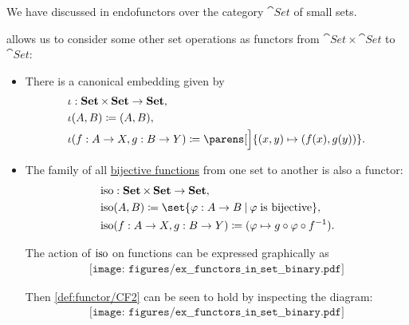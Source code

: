 \begin{example}\label{ex:functors_in_set/binary}
  We have discussed in  endofunctors over the category \( \cat{Set} \) of small sets.

   allows us to consider some other set operations as functors from \( \cat{Set} \times \cat{Set} \) to \( \cat{Set} \):
  \begin{itemize}
    \item There is a canonical embedding given by
    \begin{equation*}
      \begin{aligned}
        &\iota: \cat{Set} \times \cat{Set} \to \cat{Set}, \\
        &\iota(A, B) \coloneqq (A, B), \\
        &\iota(f: A \to X, g: B \to Y) \coloneqq \parens[\Big]{ (x, y) \mapsto (f(x), g(y)) }.
      \end{aligned}
    \end{equation*}

    \item The family of all \hyperref[def:function_invertibility/bijective]{bijective functions} from one set to another is also a functor:
    \begin{equation*}
      \begin{aligned}
        &\op{iso}: \cat{Set} \times \cat{Set} \to \cat{Set}, \\
        &\op{iso}(A, B) \coloneqq \set{ \varphi: A \to B \given \varphi \T{is bijective} }, \\
        &\op{iso}(f: A \to X, g: B \to Y) \coloneqq (\varphi \mapsto g \bincirc \varphi \bincirc f^{-1}).
      \end{aligned}
    \end{equation*}

    The action of \( \operatorname{iso} \) on functions can be expressed graphically as
    \begin{equation}\label{eq:ex:functors_in_set/binary/iso}
      \begin{aligned}
        \texttt{[image: figures/ex\_\_functors\_in\_set\_\_binary.pdf]}
      \end{aligned}
    \end{equation}

    Then \ref{def:functor/CF2} can be seen to hold by inspecting the diagram:
    \begin{equation}\label{eq:ex:functors_in_set/binary/iso_composition}
      \begin{aligned}
        \texttt{[image: figures/ex\_\_functors\_in\_set\_\_binary.pdf]}
      \end{aligned}
    \end{equation}


\end{itemize}
\end{example}
